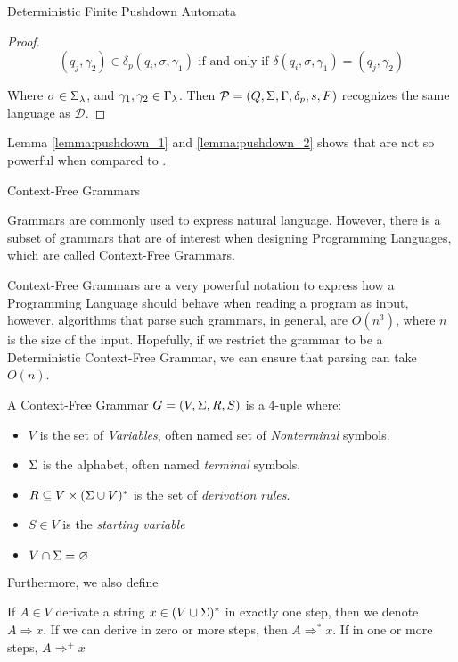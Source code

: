 \begin{section}{Deterministic Finite Pushdown Automata}
\begin{proof}
	 $$ (q_j, \gamma_2) \in
	 \delta_p(q_i, \sigma, \gamma_1) \text{ if and only if } \delta(q_i,
	 \sigma, \gamma_1) = (q_j, \gamma_2)$$

	 Where $\sigma \in \Sigma_\lambda$, and
	 $\gamma_1, \gamma_2 \in \Gamma_\lambda$. Then $\mathcal{P} = (Q, \Sigma, \Gamma,
	 \delta_p, s, F)$ recognizes the same language as $\mathcal{D}$.
\end{proof}

Lemma \ref{lemma:pushdown_1} and \ref{lemma:pushdown_2} shows that  are not
so powerful when compared to .

\end{section}

\begin{section}{Context-Free Grammars}\label{cfg}

Grammars are commonly used to express natural language. However, there is
a subset of grammars that are of interest when designing
Programming Languages, which are called Context-Free Grammars.

Context-Free Grammars are a very powerful notation to express how a Programming Language
should behave when reading a program as input, however, algorithms that parse
such grammars, in general, are $O(n^3)$, where $n$ is the size of the input. Hopefully,
if we restrict the grammar to be a Deterministic Context-Free Grammar, we can ensure
that parsing can take $O(n)$.

\begin{definition}
A Context-Free Grammar $G = (V, \Sigma, R, S)$ is a 4-uple where:
\begin{itemize}
	\item $V$ is the set of \textit{Variables}, often named set of
	\textit{Nonterminal} symbols.
	\item $\Sigma$ is the alphabet, often named \textit{terminal} symbols.
	\item $R \subseteq V \times (\Sigma \cup V)^*$ is the set of \textit{derivation rules}.
	\item $S \in V$ is the \textit{starting variable}
	\item $V \cap \Sigma = \varnothing$
\end{itemize}
\end{definition}

Furthermore, we also define

\begin{definition}
	If $A \in V$ derivate a string $x \in (V \cup \Sigma)^*$ in exactly one step, then
	we denote $A \Rightarrow x$. If we can derive in zero or more steps, then
	$A \Rightarrow^* x$. If in one or more steps, $A \Rightarrow^+ x$
\end{definition}


\end{section}
